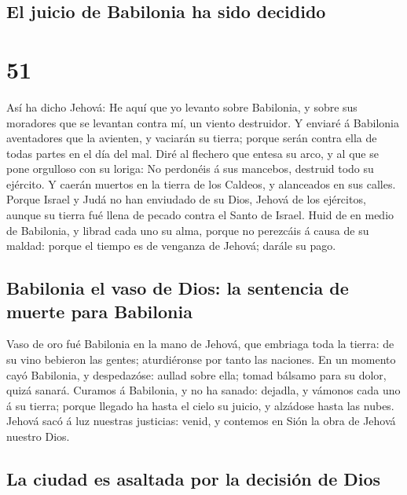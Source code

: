 \hypertarget{el-juicio-de-babilonia-ha-sido-decidido}{%
\subsection{El juicio de Babilonia ha sido
decidido}\label{el-juicio-de-babilonia-ha-sido-decidido}}

\hypertarget{section-24-51}{%
\section{51}\label{section-24-51}}

 Así ha dicho Jehová: He aquí que yo levanto sobre
Babilonia, y sobre sus moradores que se levantan contra mí, un viento
destruidor.  Y enviaré á Babilonia aventadores que la
avienten, y vaciarán su tierra; porque serán contra ella de todas partes
en el día del mal.  Diré al flechero que entesa su arco, y
al que se pone orgulloso con su loriga: No perdonéis á sus mancebos,
destruid todo su ejército.  Y caerán muertos en la tierra
de los Caldeos, y alanceados en sus calles.  Porque Israel
y Judá no han enviudado de su Dios, Jehová de los ejércitos, aunque su
tierra fué llena de pecado contra el Santo de Israel. 
Huid de en medio de Babilonia, y librad cada uno su alma, porque no
perezcáis á causa de su maldad: porque el tiempo es de venganza de
Jehová; darále su pago.

\hypertarget{babilonia-el-vaso-de-dios-la-sentencia-de-muerte-para-babilonia}{%
\subsection{Babilonia el vaso de Dios: la sentencia de muerte para
Babilonia}\label{babilonia-el-vaso-de-dios-la-sentencia-de-muerte-para-babilonia}}

 Vaso de oro fué Babilonia en la mano de Jehová, que
embriaga toda la tierra: de su vino bebieron las gentes; aturdiéronse
por tanto las naciones.  En un momento cayó Babilonia, y
despedazóse: aullad sobre ella; tomad bálsamo para su dolor, quizá
sanará.  Curamos á Babilonia, y no ha sanado: dejadla, y
vámonos cada uno á su tierra; porque llegado ha hasta el cielo su
juicio, y alzádose hasta las nubes.  Jehová sacó á luz
nuestras justicias: venid, y contemos en Sión la obra de Jehová nuestro
Dios.

\hypertarget{la-ciudad-es-asaltada-por-la-decisiuxf3n-de-dios}{%
\subsection{La ciudad es asaltada por la decisión de
Dios}\label{la-ciudad-es-asaltada-por-la-decisiuxf3n-de-dios}}

